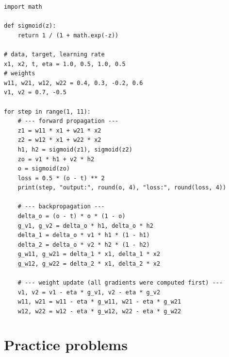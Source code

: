 \begin{verbatim}
import math

def sigmoid(z):
    return 1 / (1 + math.exp(-z))

# data, target, learning rate
x1, x2, t, eta = 1.0, 0.5, 1.0, 0.5
# weights
w11, w21, w12, w22 = 0.4, 0.3, -0.2, 0.6
v1, v2 = 0.7, -0.5

for step in range(1, 11):
    # --- forward propagation ---
    z1 = w11 * x1 + w21 * x2
    z2 = w12 * x1 + w22 * x2
    h1, h2 = sigmoid(z1), sigmoid(z2)
    zo = v1 * h1 + v2 * h2
    o = sigmoid(zo)
    loss = 0.5 * (o - t) ** 2
    print(step, "output:", round(o, 4), "loss:", round(loss, 4))

    # --- backpropagation ---
    delta_o = (o - t) * o * (1 - o)
    g_v1, g_v2 = delta_o * h1, delta_o * h2
    delta_1 = delta_o * v1 * h1 * (1 - h1)
    delta_2 = delta_o * v2 * h2 * (1 - h2)
    g_w11, g_w21 = delta_1 * x1, delta_1 * x2
    g_w12, g_w22 = delta_2 * x1, delta_2 * x2

    # --- weight update (all gradients were computed first) ---
    v1, v2 = v1 - eta * g_v1, v2 - eta * g_v2
    w11, w21 = w11 - eta * g_w11, w21 - eta * g_w21
    w12, w22 = w12 - eta * g_w12, w22 - eta * g_w22
\end{verbatim}

\section{Practice problems}

